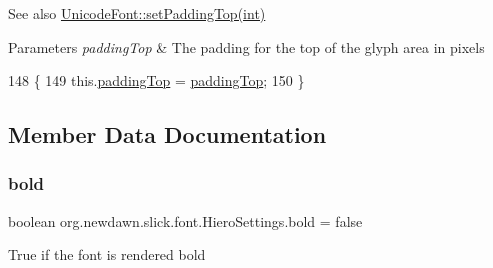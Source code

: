 \begin{DoxySeeAlso}{See also}
\mbox{\hyperlink{classorg_1_1newdawn_1_1slick_1_1_unicode_font_afae348ec73cbc25c919dc92c8d65784d}{Unicode\+Font\+::set\+Padding\+Top(int)}}
\end{DoxySeeAlso}

\begin{DoxyParams}{Parameters}
{\em padding\+Top} & The padding for the top of the glyph area in pixels \\
\hline
\end{DoxyParams}

\begin{DoxyCode}
148                                               \{
149         this.\mbox{\hyperlink{classorg_1_1newdawn_1_1slick_1_1font_1_1_hiero_settings_ad0793e48192b48898df4f3a31d4b3954}{paddingTop}} = \mbox{\hyperlink{classorg_1_1newdawn_1_1slick_1_1font_1_1_hiero_settings_ad0793e48192b48898df4f3a31d4b3954}{paddingTop}};
150     \}
\end{DoxyCode}


\subsection{Member Data Documentation}
\mbox{\label{classorg_1_1newdawn_1_1slick_1_1font_1_1_hiero_settings_a836242ef5a8edc24a2b5b8c85f9160eb}} 
\subsubsection{\texorpdfstring{bold}{bold}}
{\footnotesize\ttfamily boolean org.\+newdawn.\+slick.\+font.\+Hiero\+Settings.\+bold = false\hspace{0.3cm}{\ttfamily [private]}}

True if the font is rendered bold \mbox{\label{classorg_1_1newdawn_1_1slick_1_1font_1_1_hiero_settings_ad1134cfcc8c0f5d582f8abe54d7eeb80}} 
